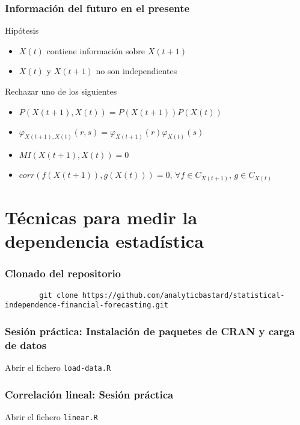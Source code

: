 \documentclass[t,9pt,pdftex]{beamer}
\begin{document}
\begin{frame}[c]
	\frametitle{Informaci\'on del futuro en el presente}	
	\begin{block}{Hip\'otesis}
		\begin{itemize}
		\item $X(t)$ contiene informaci\'on sobre $X(t+1)$
		\item $X(t)$ y $X(t+1)$ no son independientes
		\end{itemize}
	\end{block}
	
	\begin{exampleblock}{Rechazar uno de los siguientes}
		\begin{itemize}
		\item $P(X(t+1),X(t)) = P(X(t+1))P(X(t))$
		\item $\varphi_{X(t+1),X(t)}(r,s) = \varphi_{X(t+1)}(r)\varphi_{X(t)}(s)$
		\item $MI(X(t+1),X(t))=0$
		\item $corr(f(X(t+1)), g(X(t))) = 0$, $\forall f \in C_{X(t+1)}$, $g \in C_{X(t)}$
		\end{itemize}
	\end{exampleblock}
\end{frame}


\section{T\'ecnicas para medir la dependencia estad\'istica}


\begin{frame}[c,containsverbatim]
\frametitle{Clonado del repositorio}
	\begin{lstlisting}
		git clone https://github.com/analyticbastard/statistical-independence-financial-forecasting.git
	\end{lstlisting}
		
\end{frame}

\begin{frame}[c,containsverbatim]
\frametitle{Sesi\'on pr\'actica: Instalaci\'on de paquetes de CRAN y carga de datos}
	Abrir el fichero \texttt{load-data.R}
		
\end{frame}

\begin{frame}[c,containsverbatim]
\frametitle{Correlaci\'on lineal: Sesi\'on pr\'actica}
	Abrir el fichero \texttt{linear.R}
\end{frame}
\end{document}

